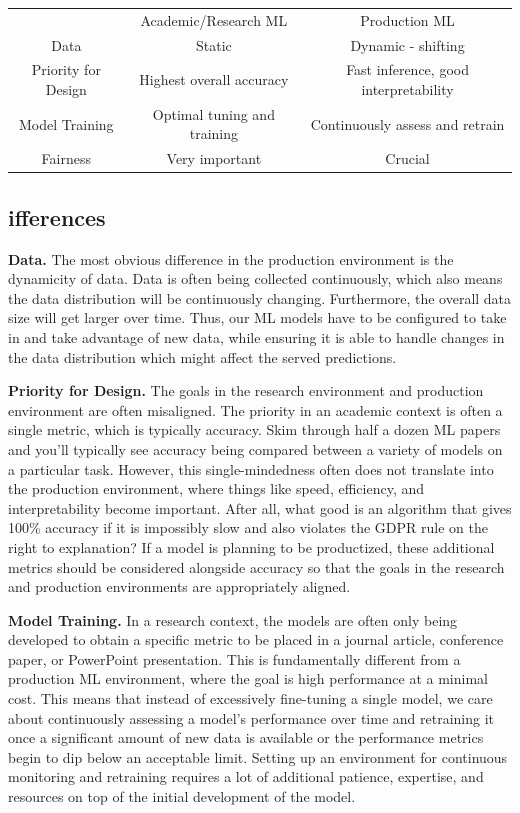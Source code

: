 {{    \begin{tabular}{ccc}
       & Academic/Research ML &   Production ML \\
        Data &  Static &    Dynamic - shifting \\
     Priority for Design & Highest overall accuracy &  Fast inference, good interpretability \\
     Model Training & Optimal tuning and training &  Continuously assess and retrain \\
        Fairness & Very important &     Crucial \\
  \end{tabular}        
    
\subsection{ifferences}
    
    \textbf{Data.} The most obvious difference in the production environment is the dynamicity of data. Data is often being collected continuously, which also means the data distribution will be continuously changing. Furthermore, the overall data size will get larger over time. Thus, our ML models have to be configured to take in and take advantage of new data, while ensuring it is able to handle changes in the data distribution which might affect the served predictions.
    
    \textbf{Priority for Design.} The goals in the research environment and production environment are often misaligned. The priority in an academic context is often a single metric, which is typically accuracy. Skim through half a dozen ML papers and you’ll typically see accuracy being compared between a variety of models on a particular task. However, this single-mindedness often does not translate into the production environment, where things like speed, efficiency, and interpretability become important. After all, what good is an algorithm that gives 100\% accuracy if it is impossibly slow and also violates the GDPR rule on the right to explanation? If a model is planning to be productized, these additional metrics should be considered alongside accuracy so that the goals in the research and production environments are appropriately aligned.
    
    \textbf{Model Training. }In a research context, the models are often only being developed to obtain a specific metric to be placed in a journal article, conference paper, or PowerPoint presentation. This is fundamentally different from a production ML environment, where the goal is high performance at a minimal cost. This means that instead of excessively fine-tuning a single model, we care about continuously assessing a model’s performance over time and retraining it once a significant amount of new data is available or the performance metrics begin to dip below an acceptable limit. Setting up an environment for continuous monitoring and retraining requires a lot of additional patience, expertise, and resources on top of the initial development of the model.
    
}}
